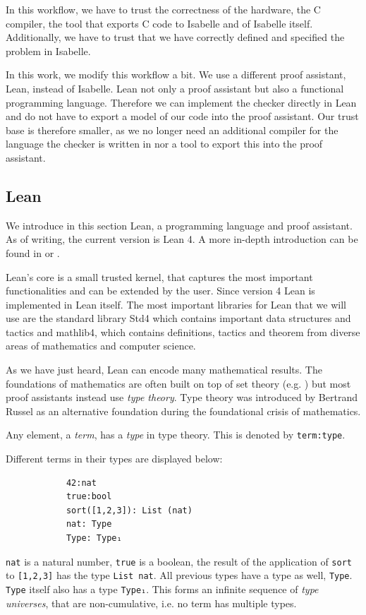In this workflow, we have to trust the correctness of the hardware, the C compiler, the tool that exports C code to Isabelle and of Isabelle itself. Additionally, we have to trust that we have correctly defined and specified the problem in Isabelle.

In this work, we modify this workflow a bit. We use a different proof assistant, Lean, instead of Isabelle. Lean not only a proof assistant but also a functional programming language. Therefore we can implement the checker directly in Lean and do not have to export a model of our code into the proof assistant. Our trust base is therefore smaller, as we no longer need an additional compiler for the language the checker is written in nor a tool to export this into the proof assistant. 


\subsection{Lean}
We introduce in this section Lean, a programming language and proof assistant. As of writing, the current version is Lean 4. A more in-depth introduction can be found in \cite{theoremProvingLean} or \cite{functionalProgrammingLean}.

Lean's core is a small trusted kernel\cite{LeanSysDescr}, that captures the most important functionalities and can be extended by the user. Since version 4 Lean is implemented in Lean itself\cite{Lean4}. The most important libraries for Lean that we will use are the standard library Std4\cite{stdLean} which contains important data structures and tactics and mathlib4\cite{mathlib}, which contains definitions, tactics and theorem from diverse areas of mathematics and computer science.

As we have just heard, Lean can encode many mathematical results. The foundations of mathematics are often built on top of set theory (e.g. \cite{logic}) but most proof assistants instead use \textit{type theory}. Type theory was introduced by Bertrand Russel as an alternative foundation during the foundational crisis of mathematics.

Any element, a \textit{term}, has a \textit{type} in type theory. This is denoted by \lstinline|term:type|. 

\begin{example}
    Different terms in their types are displayed below:
        \begin{lstlisting}
            42:nat
            true:bool
            sort([1,2,3]): List (nat)
            nat: Type
            Type: Type₁
        \end{lstlisting}

        \lstinline|nat| is a natural number, \lstinline|true| is a boolean, the result of the application of \lstinline|sort| to \lstinline|[1,2,3]| has the type \lstinline|List nat|. All previous types have a type as well, \lstinline|Type|. \lstinline|Type| itself also has a type \lstinline|Type₁|. This forms an infinite sequence of \textit{type universes}, that are non-cumulative, i.e. no term has multiple types.
\end{example}


